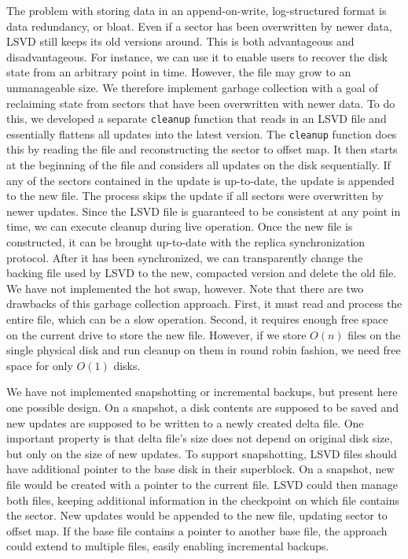 The problem with storing data in an append-on-write, log-structured format is data redundancy, or bloat. Even if a sector has been overwritten by newer data, LSVD still keeps its old versions around. This is both advantageous and disadvantageous. For instance, we can use it to enable users to recover the disk state from an arbitrary point in time. However, the file may grow to an unmanageable size. We therefore implement garbage collection with a goal of reclaiming state from sectors that have been overwritten with newer data. To do this, we developed a separate \texttt{cleanup} function that reads in an LSVD file and essentially flattens all updates into the latest version. The \texttt{cleanup} function does this by reading the file and reconstructing the sector to offset map. It then starts at the beginning of the file and considers all updates on the disk sequentially. If any of the sectors contained in the update is up-to-date, the update is appended to the new file. The process skips the update if all sectors were overwritten by newer updates. Since the LSVD file is guaranteed to be consistent at any point in time, we can execute cleanup during live operation. Once the new file is constructed, it can be brought up-to-date with the replica synchronization protocol. After it has been synchronized, we can transparently change the backing file used by LSVD to the new, compacted version and delete the old file. We have not implemented the hot swap, however. Note that there are two drawbacks of this garbage collection approach. First, it must read and process the entire file, which can be a slow operation. Second, it requires enough free space on the current drive to store the new file. However, if we store $O(n)$ files on the single physical disk and run cleanup on them in round robin fashion, we need free space for only $O(1)$ disks.

We have not implemented snapshotting or incremental backups, but present here one possible design. On a snapshot, a disk contents are supposed to be saved and new updates are supposed to be written to a newly created delta file. One important property is that delta file's size does not depend on original disk size, but only on the size of new updates. To support snapshotting, LSVD files should have additional pointer to the base disk in their superblock. On a snapshot, new file would be created with a pointer to the current file. LSVD could then manage both files, keeping additional information in the checkpoint on which file contains the sector. New updates would be appended to the new file, updating sector to offset map. If the base file contains a pointer to another base file, the approach could extend to multiple files, easily enabling incremental backups.

